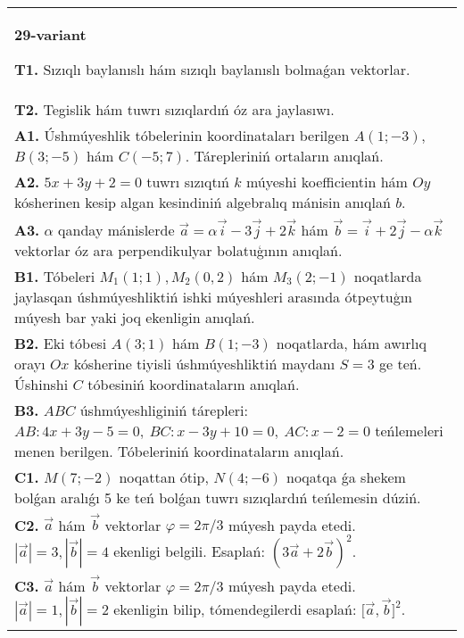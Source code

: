 \documentclass{article}
\begin{document}
\begin{tabular}{m{17cm}}
\textbf{29-variant}

\textbf{T1.} 
Sızıqlı baylanıslı hám sızıqlı baylanıslı bolmaǵan vektorlar.
 \\
\textbf{T2.} 
Tegislik hám tuwrı sızıqlardıń óz ara jaylasıwı.
 \\
\textbf{A1.} 
Úshmúyeshlik tóbelerinin koordinataları berilgen
$A (1;-3) $, $B (3;-5) $ hám $C (-5;7) $. Tárepleriniń ortaların
anıqlań.
 \\
\textbf{A2.} 
$5x+3y+2=0$ tuwrı sızıqtıń $k$ múyeshi
koefficientin hám $Oy$ kósherinen kesip algan kesindiniń algebralıq
mánisin anıqlań $b$.
 \\
\textbf{A3.} 
$\alpha$
qanday mánislerde
$\overrightarrow{a} = \alpha\overrightarrow{i} - 3\overrightarrow{j} + 2\overrightarrow{k}$
hám
$\overrightarrow{b} = \overrightarrow{i} + 2\overrightarrow{j} - \alpha\overrightarrow{k}$
vektorlar óz ara perpendikulyar bolatuģının anıqlań.
 \\
\textbf{B1.} 
Tóbeleri \(M_{1} (1;1), M_{2} (0,2) \) hám
\(M_{3} (2;-1) \) noqatlarda jaylasqan úshmúyeshliktiń ishki
múyeshleri arasında ótpeytuģın múyesh bar yaki joq ekenligin anıqlań.
 \\
\textbf{B2.} 
Eki tóbesi \(A (3;1) \) hám \(B (1;-3) \) noqatlarda, hám
awırlıq orayı $Ox$ kósherine tiyisli úshmúyeshliktiń maydanı
\(S=3\) ge teń. Úshinshi $C$ tóbesiniń koordinataların anıqlań.
 \\
\textbf{B3.} 
$ABC$ úshmúyeshliginiń tárepleri:
\(AB:4x+3y-5=0,\ BC:x-3y+10=0,\ AC:x-2=0\)
teńlemeleri menen berilgen. Tóbeleriniń koordinataların anıqlań.
 \\
\textbf{C1.} 
\(M (7;-2) \) noqattan ótip, \(N (4;-6) \) noqatqa
ǵa shekem bolǵan aralıǵı 5 ke teń bolǵan tuwrı sızıqlardıń teńlemesin dúziń.
 \\
\textbf{C2.} 
$\vec{a}$ hám $\vec{b}$ vektorlar $\varphi = 2\pi/3$ múyesh payda etedi. $|\vec{a}| = 3,|\vec{b}| = 4$ ekenligi belgili. Esaplań: $ (3\vec{a} + 2\vec{b}) ^{2}$.
 \\
\textbf{C3.} 
$\vec{a}$ hám $\vec{b}$ vektorlar $\varphi = 2\pi/3$ múyesh payda etedi. $|\vec{a}| = 1,|\vec{b}| = 2$ ekenligin bilip, tómendegilerdi esaplań:
$\lbrack\vec{a},\vec{b}\rbrack^{2}$.
 \\

\end{tabular}
\vspace{1cm}
\end{document}
